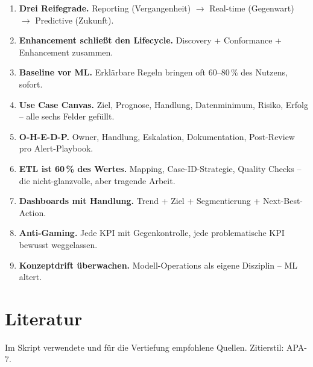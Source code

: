 \documentclass[11pt,a4paper,oneside]{article}
\begin{document}
\begin{enumerate}
  \item \textbf{Drei Reifegrade.} Reporting (Vergangenheit) $\rightarrow$ Real-time (Gegenwart) $\rightarrow$ Predictive (Zukunft).
  \item \textbf{Enhancement schließt den Lifecycle.} Discovery + Conformance + Enhancement zusammen.
  \item \textbf{Baseline vor ML.} Erklärbare Regeln bringen oft 60--80\,\% des Nutzens, sofort.
  \item \textbf{Use Case Canvas.} Ziel, Prognose, Handlung, Datenminimum, Risiko, Erfolg -- alle sechs Felder gefüllt.
  \item \textbf{O-H-E-D-P.} Owner, Handlung, Eskalation, Dokumentation, Post-Review pro Alert-Playbook.
  \item \textbf{ETL ist 60\,\% des Wertes.} Mapping, Case-ID-Strategie, Quality Checks -- die nicht-glanzvolle, aber tragende Arbeit.
  \item \textbf{Dashboards mit Handlung.} Trend + Ziel + Segmentierung + Next-Best-Action.
  \item \textbf{Anti-Gaming.} Jede KPI mit Gegenkontrolle, jede problematische KPI bewusst weggelassen.
  \item \textbf{Konzeptdrift überwachen.} Modell-Operations als eigene Disziplin -- ML altert.
\end{enumerate}

\clearpage
\section{Literatur}

Im Skript verwendete und für die Vertiefung empfohlene Quellen. Zitierstil: APA-7.
\end{document}
